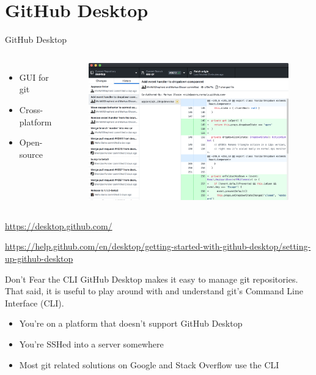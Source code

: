 \documentclass{beamer}
\begin{document}
    \section{GitHub Desktop}
    \begin{frame}{GitHub Desktop}
        \begin{columns}
            \begin{itemize}
                \item GUI for git
                \item Cross-platform
                \item Open-source
            \end{itemize}

            \begin{figure}
                \centering
                \includegraphics[width=\textwidth]{figures/github-desktop-screenshot-mac.png}
            \end{figure}
        \end{columns}
        \centering
        \url{https://desktop.github.com/}

        \url{https://help.github.com/en/desktop/getting-started-with-github-desktop/setting-up-github-desktop}
    \end{frame}

    \begin{frame}{Don't Fear the CLI}
        GitHub Desktop makes it easy to manage git repositories. That said, it is useful to play around with and understand git's Command Line Interface (CLI).
        \begin{itemize}
            \item You're on a platform that doesn't support GitHub Desktop
            \item You're SSHed into a server somewhere
            \item Most git related solutions on Google and Stack Overflow use the CLI
        \end{itemize}
    \end{frame}
\end{document}
